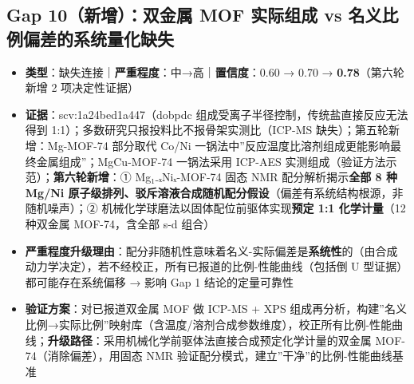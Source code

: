\documentclass[12pt,a4paper]{ctexart}
\providecommand{\tightlist}{%
  \setlength{\itemsep}{0pt}\setlength{\parskip}{0pt}}
\begin{document}
\subsection{Gap 10（新增）：双金属 MOF 实际组成 vs 名义比例偏差的系统量化缺失}\label{gap:gap-10ux65b0ux589eux53ccux91d1ux5c5e-mof-ux5b9eux9645ux7ec4ux6210-vs-ux540dux4e49ux6bd4ux4f8bux504fux5deeux7684ux7cfbux7edfux91cfux5316ux7f3aux5931}

\begin{itemize}
\tightlist
\item
  \textbf{类型}：缺失连接｜\textbf{严重程度}：中→高｜\textbf{置信度}：0.60 → 0.70 → \textbf{0.78}（第六轮新增 2 项决定性证据）
\item
  \textbf{证据}：scv:1a24bed1a447（dobpdc 组成受离子半径控制，传统盐直接反应无法得到 1:1）；多数研究只报投料比不报骨架实测比（ICP-MS 缺失）；第五轮新增：Mg-MOF-74 部分取代 Co/Ni 一锅法中''反应温度比溶剂组成更能影响最终金属组成''；MgCu-MOF-74 一锅法采用 ICP-AES 实测组成（验证方法示范）；\textbf{第六轮新增}：① Mg₁₋ₓNiₓ-MOF-74 固态 NMR 配分解析揭示\textbf{全部 8 种 Mg/Ni 原子级排列、驳斥溶液合成随机配分假设}（偏差有系统结构根源，非随机噪声）；② 机械化学球磨法以固体配位前驱体实现\textbf{预定 1:1 化学计量}（12 种双金属 MOF-74，含全部 s-d 组合）
\item
  \textbf{严重程度升级理由}：配分非随机性意味着名义-实际偏差是\textbf{系统性}的（由合成动力学决定），若不经校正，所有已报道的比例-性能曲线（包括倒 U 型证据）都可能存在系统偏移 → 影响 Gap 1 结论的定量可靠性
\item
  \textbf{验证方案}：对已报道双金属 MOF 做 ICP-MS + XPS 组成再分析，构建''名义比例→实际比例''映射库（含温度/溶剂合成参数维度），校正所有比例-性能曲线；\textbf{升级路径}：采用机械化学前驱体法直接合成预定化学计量的双金属 MOF-74（消除偏差），用固态 NMR 验证配分模式，建立''干净''的比例-性能曲线基准
\end{itemize}

\printbibliography[title=参考文献]
\end{document}
